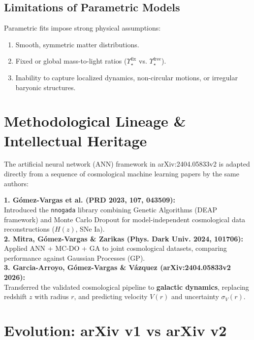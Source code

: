\documentclass[11pt,a4paper]{article}
\begin{document}
\subsection{Limitations of Parametric Models}
Parametric fits impose strong physical assumptions:
\begin{enumerate}
    \item Smooth, symmetric matter distributions.
    \item Fixed or global mass-to-light ratios ($\Upsilon_\star^{\text{fix}}$ vs. $\Upsilon_\star^{\text{free}}$).
    \item Inability to capture localized dynamics, non-circular motions, or irregular baryonic structures.
\end{enumerate}

\section{Methodological Lineage \& Intellectual Heritage}

The artificial neural network (ANN) framework in arXiv:2404.05833v2 is adapted directly from a sequence of cosmological machine learning papers by the same authors:

\begin{tcolorbox}[colback=blue!5!white,colframe=blue!75!black,title=Methodological Lineage]
\textbf{1. G\'omez-Vargas et al. (PRD 2023, 107, 043509):}\\
Introduced the \texttt{nnogada} library combining Genetic Algorithms (DEAP framework) and Monte Carlo Dropout for model-independent cosmological data reconstructions ($H(z)$, SNe Ia).\\

\textbf{2. Mitra, G\'omez-Vargas \& Zarikas (Phys. Dark Univ. 2024, 101706):}\\
Applied ANN + MC-DO + GA to joint cosmological datasets, comparing performance against Gaussian Processes (GP).\\

\textbf{3. Garcia-Arroyo, G\'omez-Vargas \& V\'azquez (arXiv:2404.05833v2 2026):}\\
Transferred the validated cosmological pipeline to \textbf{galactic dynamics}, replacing redshift $z$ with radius $r$, and predicting velocity $V(r)$ and uncertainty $\sigma_V(r)$.
\end{tcolorbox}

\section{Evolution: arXiv v1 vs arXiv v2}
\end{document}
